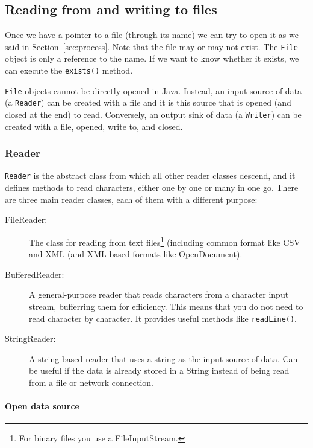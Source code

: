 \subsection{Reading from and writing to files}
\label{sec:reading-from-writing}

Once we have a pointer to a file (through its name) we can try to open
it as we said in Section~\ref{sec:process}. Note that the file may or
may not exist. The \verb+File+ object is only a reference to the
name. If we want to know whether it exists, we can execute the
\verb+exists()+ method. 

\verb+File+ objects cannot be directly opened in Java. Instead, an
input source of data (a \verb+Reader+) can be created with a file and
it is this source that is opened (and closed at the end) to
read. Conversely, an output sink of data (a \verb+Writer+) can be
created with a file, opened, write to, and closed. 


\subsubsection{Reader}
\label{sec:reader}

\verb+Reader+ is the abstract class from which all other reader
classes descend, and it defines methods to read characters, either one
by one or many in one go. 
There are three main reader classes, each of them with
a different purpose: 

\begin{description}
\item[FileReader: ] The class for reading from text files\footnote{For
  binary files you use a FileInputStream.} (including
  common format like CSV and XML (and XML-based formats like
  OpenDocument). 
\item[BufferedReader: ] A general-purpose reader that reads characters
  from a character input stream, bufferring them for efficiency. This
  means that you do not need to read character by character. It
  provides useful methods like \verb+readLine()+.
\item[StringReader: ] A string-based reader that uses a string as the
  input source of data. Can be useful if the data is already stored in
  a String instead of being read from a file or network connection. 
\end{description}

\paragraph{Open data source}
\label{sec:open-data-source}

